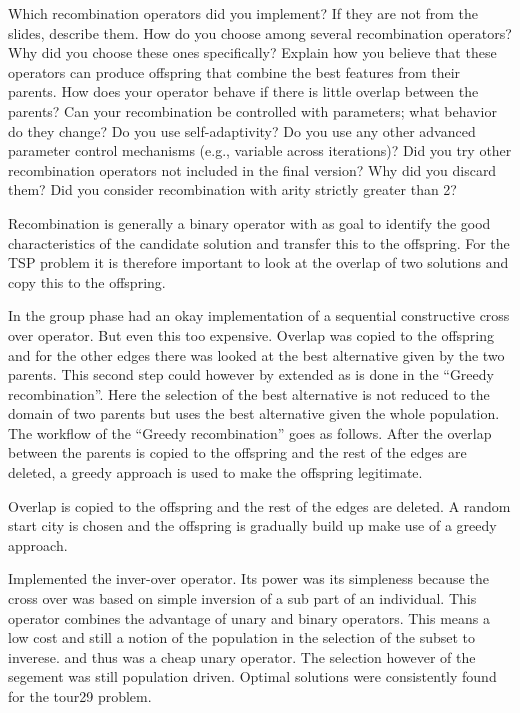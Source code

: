 \documentclass[a4paper,10pt]{article}
\newcommand{\ReplaceMe}[1]{{\color{blue}#1}}
\begin{document}
\ReplaceMe{Which recombination operators did you implement? If they are not from the slides, describe them. How do you choose among several recombination operators? Why did you choose these ones specifically? Explain how you believe that these operators can produce offspring that combine the best features from their parents. How does your operator behave if there is little overlap between the parents? Can your recombination be controlled with parameters; what behavior do they change? Do you use self-adaptivity? Do you use any other advanced parameter control mechanisms (e.g., variable across iterations)? Did you try other recombination operators not included in the final version? Why did you discard them? Did you consider recombination with arity strictly greater than 2?}

Recombination is generally a binary operator with as goal to identify the good characteristics of the candidate solution and transfer this to the offspring. For the TSP problem it is therefore important to look at the overlap of two solutions and copy this to the offspring. 

In the group phase had an okay implementation of a sequential constructive cross over operator. But even this too expensive. Overlap was copied to the offspring and for the other edges there was looked at the best alternative given by the two parents. This second step could however by extended as is done in the ``Greedy recombination''. Here the selection of the best alternative is not reduced to the domain of two parents but uses the best alternative given the whole population. The workflow of the ``Greedy recombination'' goes as follows. After the overlap between the parents is copied to the offspring and the rest of the edges are deleted, a greedy approach is used to make the offspring legitimate.  

Overlap is copied to the offspring and the rest of the edges are deleted. A random start city is chosen and the offspring is gradually build up make use of a greedy approach. 

Implemented the inver-over operator. Its power was its simpleness because the cross over was based on simple inversion of a sub part of an individual. This operator combines the advantage of unary and binary operators. This means a low cost and still a notion of the population in the selection of the subset to inverese. and thus was a cheap unary operator. The selection however of the segement was still population driven. Optimal solutions were consistently found for the tour29 problem. 
\end{document}
